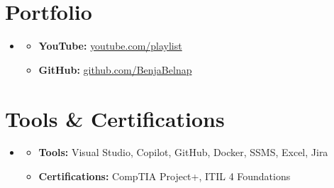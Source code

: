 \documentclass[letterpaper,11pt]{article}
\newcommand{\cvitem}[1]{
  \item\small{
    {#1\vspace{-2pt}}
  }
}
\newcommand{\cvheadingstart}{\begin{itemize}[leftmargin=0in, label={}]}
\newcommand{\cvheadingend}{\end{itemize}}
\newcommand{\cvitemstart}{\begin{itemize}[label=\textopenbullet]\justifying}
\newcommand{\cvitemend}{\end{itemize}\vspace{-5pt}}
\begin{document}
\begin{minipage}[t]{0.48\textwidth}
\section{Portfolio}
\cvheadingstart
\item
\cvitemstart
  \cvitem{\textbf{YouTube:} \href{https://www.youtube.com/watch?v=8RIIMyDkq1o&list=PLUzrl_qGh1VwDzHbBU4ZeU0BwMCtkR06B}{youtube.com/playlist}}
  \cvitem{\textbf{GitHub:} \href{https://github.com/BenjaBelnap}{github.com/BenjaBelnap}}
\cvitemend
\cvheadingend
\end{minipage}
\hfill
\begin{minipage}[t]{0.48\textwidth}
\section{Tools \& Certifications}
\cvheadingstart
\item
\cvitemstart
  \cvitem{\textbf{Tools:} Visual Studio, Copilot, GitHub, Docker, SSMS, Excel, Jira}
  \cvitem{\textbf{Certifications:} CompTIA Project+, ITIL 4 Foundations}
\cvitemend
\cvheadingend
\end{minipage}
\end{document}
